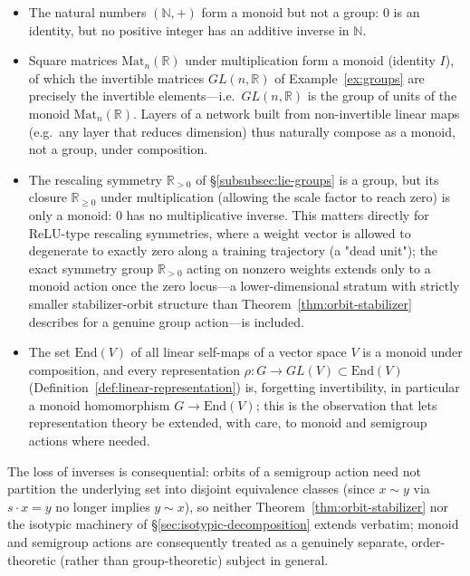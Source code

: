 \documentclass[mathematics,review,submit,moreauthors]{Definitions/mdpi}
\begin{document}
\begin{Example}
\label{ex:semigroups-in-learning}
\begin{itemize}
    \item The natural numbers $(\mathbb{N}, +)$ form a monoid but not a
    group: $0$ is an identity, but no positive integer has an additive
    inverse in $\mathbb{N}$.
    \item Square matrices $\mathrm{Mat}_n(\mathbb{R})$ under multiplication
    form a monoid (identity $I$), of which the invertible matrices
    $GL(n,\mathbb{R})$ of Example~\ref{ex:groups} are precisely the
    invertible elements---i.e.\ $GL(n,\mathbb{R})$ is the group of units of
    the monoid $\mathrm{Mat}_n(\mathbb{R})$. Layers of a network built from
    non-invertible linear maps (e.g.\ any layer that reduces dimension) thus
    naturally compose as a monoid, not a group, under composition.
    \item The rescaling symmetry $\mathbb{R}_{>0}$ of
    \S\ref{subsubsec:lie-groups} is a group, but its closure
    $\mathbb{R}_{\geq 0}$ under multiplication (allowing the scale factor to
    reach zero) is only a monoid: $0$ has no multiplicative inverse. This
    matters directly for ReLU-type rescaling symmetries, where a weight
    vector is allowed to degenerate to exactly zero along a training
    trajectory (a "dead unit"); the exact symmetry group
    $\mathbb{R}_{>0}$ acting on nonzero weights extends only to a
    monoid action once the zero locus---a lower-dimensional stratum with
    strictly smaller stabilizer-orbit structure than
    Theorem~\ref{thm:orbit-stabilizer} describes for a genuine group
    action---is included.
    \item The set $\mathrm{End}(V)$ of all linear self-maps of a vector
    space $V$ is a monoid under composition, and every representation
    $\rho: G \to GL(V) \subset \mathrm{End}(V)$
    (Definition~\ref{def:linear-representation}) is, forgetting
    invertibility, in particular a monoid homomorphism $G \to
    \mathrm{End}(V)$; this is the observation that lets representation
    theory be extended, with care, to monoid and semigroup actions where
    needed.
\end{itemize}
\end{Example}

The loss of inverses is consequential: orbits of a semigroup action need not
partition the underlying set into disjoint equivalence classes (since
$x \sim y$ via $s \cdot x = y$ no longer implies $y \sim x$), so neither
Theorem~\ref{thm:orbit-stabilizer} nor the isotypic machinery of
\S\ref{sec:isotypic-decomposition} extends verbatim; monoid and
semigroup actions are consequently treated as a genuinely separate,
order-theoretic (rather than group-theoretic) subject in general.
\end{document}
